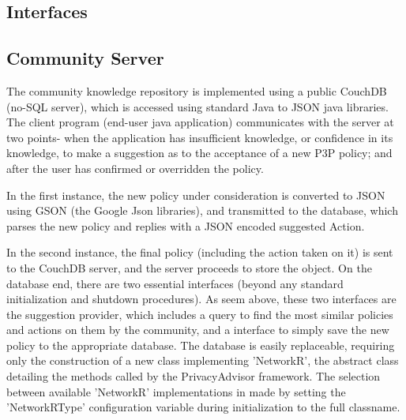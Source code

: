 \subsection{Interfaces}







\subsection{Community Server} %
The community knowledge repository is implemented using a public CouchDB (no-SQL server), which is accessed using standard Java to JSON java libraries. The client program (end-user java application) communicates with the server at two points- when the application has insufficient knowledge, or confidence in its knowledge, to make a suggestion as to the acceptance of a new P3P policy; and after the user has confirmed or overridden the policy.

In the first instance, the new policy under consideration is converted to JSON using GSON (the Google Json libraries), and transmitted to the database, which parses the new policy and replies with a JSON encoded suggested Action.

In the second instance, the final policy (including the action taken on it) is sent to the CouchDB server, and the server proceeds to store the object.
On the database end, there are two essential interfaces (beyond any standard initialization and shutdown procedures). As seem above, these two interfaces are the suggestion provider, which includes a query to find the most similar policies and actions on them by the community, and a interface to simply save the new policy to the appropriate database.
The database is easily replaceable, requiring only the construction of a new class implementing 'NetworkR', the abstract class detailing the methods called by the PrivacyAdvisor framework. The selection between available 'NetworkR' implementations in made by setting the 'NetworkRType' configuration variable during initialization to the full classname.
